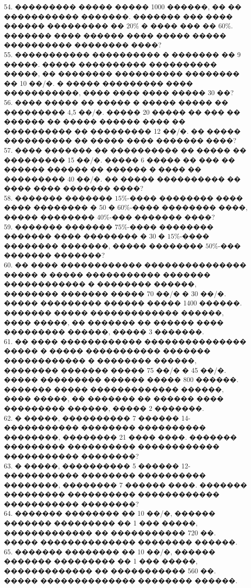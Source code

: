 \documentclass[12pt]{article}
\begin{document}
54. ��������� ����� ����� 1000 ������, �� �� ����������� �������. ������� ��� ���� ������ ��������� �� $20\%$ � ���� ��� �� $60\%.$ ������� ���� ������ ���� ����� ����� ���������� �������� ����?\\
55. ����������� ���������� � ������� �� 9 �����. ����� ���������� ���������� �����, �� �������� ���������� �������� �� 10 ��/�. � ����� ��������� ���� �����������, ���� ���� ���� ����� 30 ��?\\
56. ���� ����� �� ����� � ����� ����� �� ��������� 4,5 ��/�. ����� 20 ����� �� ��� �� ������ �� ����� ������ ���� �� ���������� �� ��������� 12 ��/�. �� ����� ���������� �� ����� ���� ������� ����?\\
57. ���� ������� �� ���������� �� ����� �� ��������� 15 ��/�. ����� 6 ����� �� ��� �� ������ ������ �� ������ � ���� �� ��������� 40 ��/�. �� ����� ���������� �� ���� ���� ������� ����?\\
58. ������� ������� $15\%$-���� �������� ���� ���� �������� � 50 � $60\%$-���� �������� ����, ����� �������� $40\%$-��� ������� ����?\\
59. ������� ������� $75\%$-���� �������� ������� ���� �������� � 30 � $15\%$-���� �������� �������, ����� �������� $50\%$-��� ������� �������?\\
60. �� ���� ������������ ��������������� ����� � ����� ����������� ������� ������������ � �������� ������, �������� ������� ����� 70 ��/� � 30 ��/�. ����� ��������� ������ ����� 1400 ������. ������� ����� ������������� ������, ���� �����, �� ������� �� ������ ���� ��������� ������, ����� 3 �������.\\
61. �� ���� ������������ ��������������� ����� � ����� ����������� ������� ������������ � �������� ������, �������� ������� ����� 75 ��/� � 45 ��/�. ����� ��������� ������ ����� 800 ������. ������� ����� ������������� ������, ���� �����, �� ������� �� ������ ���� ��������� ������, ����� 2 �������.\\
62. � �����, ���������� 7 ������ 14-����������� �������� ���������� ��������, �������� 21 ���� ����. ������� ��������� ���������� ������������ ����������� ��������?\\
63. � �����, ���������� 5 ������ 12-����������� �������� ���������� ��������, �������� 7 ������ ����. ������� ��������� ���������� ������������ ����������� ��������?\\
64. ������� �������� �� 10 ��/�, ������ ������� ��������� �� 1 ��� �����, ������������� �� ����������� 720 ��. ����� �������������� �������� ������.\\
65. ������� �������� �� 10 ��/�, ������ ������� ��������� �� 1 ��� �����, ������������� �� ����������� 560 ��. ����� �������������� �������� ������.\\
\end{document}
